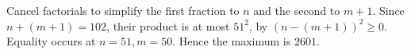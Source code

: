 Cancel factorials to simplify the first fraction to $n$ and the second to $m+1$. Since $n+(m+1)=102$, their product is at most $51^2$, by $(n-(m+1))^2\ge0$. Equality occurs at $n=51,m=50$. Hence the maximum is $\boxed{2601}$.
